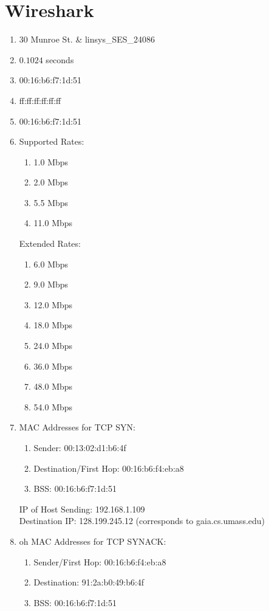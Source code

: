 \documentclass[11pt]{article}
\begin{document}
\section{Wireshark}
\begin{enumerate}[label=(\alph*)]
\item {
	30 Munroe St. \& linsys\_SES\_24086

}
\item {
	$0.1024$ seconds
}
\item {
	00:16:b6:f7:1d:51
}
\item {
	ff:ff:ff:ff:ff:ff
}
\item  {
	00:16:b6:f7:1d:51
}
\item  {
	Supported Rates:
	\begin{enumerate}
		\item 1.0 Mbps
		\item 2.0 Mbps
		\item 5.5 Mbps
		\item 11.0 Mbps
	\end{enumerate}
	
	Extended Rates:
	\begin{enumerate}
		\item 6.0 Mbps
		\item 9.0 Mbps
		\item 12.0 Mbps
		\item 18.0 Mbps
		\item 24.0 Mbps
		\item 36.0 Mbps
		\item 48.0 Mbps
		\item 54.0 Mbps
	\end{enumerate}
}
\item  {
	MAC Addresses for TCP SYN:
	\begin{enumerate}
		\item Sender:  00:13:02:d1:b6:4f
		\item Destination/First Hop: 00:16:b6:f4:eb:a8
		\item BSS: 00:16:b6:f7:1d:51
	\end{enumerate}
	
	IP of Host Sending: 192.168.1.109 \\
	Destination IP: 128.199.245.12 (corresponds to gaia.cs.umass.edu)
}
\item  {oh 
	MAC Addresses for TCP SYNACK:
	\begin{enumerate}
		\item Sender/First Hop:  00:16:b6:f4:eb:a8
		\item Destination: 91:2a:b0:49:b6:4f
		\item BSS: 00:16:b6:f7:1d:51
	\end{enumerate}
	
}
\end{enumerate}
\end{document}
